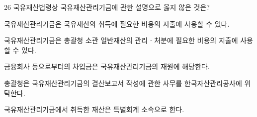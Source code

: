 \begin{question}{26}
국유재산법령상 국유재산관리기금에 관한 설명으로 옳지 않은 것은?
\begin{choices}
  \item 국유재산관리기금은 국유재산의 취득에 필요한 비용의 지출에 사용할 수 있다.
  \item 국유재산관리기금은 총괄청 소관 일반재산의 관리ㆍ처분에 필요한 비용의 지출에 사용할 수 있다.
  \item 금융회사 등으로부터의 차입금은 국유재산관리기금의 재원에 해당한다.
  \item 총괄청은 국유재산관리기금의 결산보고서 작성에 관한 사무를 한국자산관리공사에 위탁한다.
  \item 국유재산관리기금에서 취득한 재산은 특별회계 소속으로 한다.
\end{choices}
\end{question}
